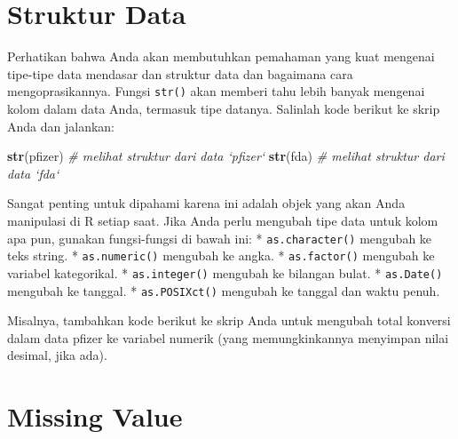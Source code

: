 \documentclass[
]{book}
\newenvironment{Shaded}{\begin{snugshade}}{\end{snugshade}}
\newcommand{\CommentTok}[1]{\textcolor[rgb]{0.56,0.35,0.01}{\textit{#1}}}
\newcommand{\KeywordTok}[1]{\textcolor[rgb]{0.13,0.29,0.53}{\textbf{#1}}}
\newcommand{\NormalTok}[1]{#1}
\newcommand{\OperatorTok}[1]{\textcolor[rgb]{0.81,0.36,0.00}{\textbf{#1}}}
\newcommand{\StringTok}[1]{\textcolor[rgb]{0.31,0.60,0.02}{#1}}
\begin{document}
\hypertarget{struktur-data}{%
\section{Struktur Data}\label{struktur-data}}

Perhatikan bahwa Anda akan membutuhkan pemahaman yang kuat mengenai tipe-tipe data mendasar dan struktur data dan bagaimana cara mengoprasikannya. Fungsi \texttt{str()} akan memberi tahu lebih banyak mengenai kolom dalam data Anda, termasuk tipe datanya. Salinlah kode berikut ke skrip Anda dan jalankan:

\begin{Shaded}
\begin{Highlighting}[]
\KeywordTok{str}\NormalTok{(pfizer)                                       }\CommentTok{# melihat struktur dari data `pfizer`}
\KeywordTok{str}\NormalTok{(fda)                                          }\CommentTok{# melihat struktur dari data `fda`}
\end{Highlighting}
\end{Shaded}

Sangat penting untuk dipahami karena ini adalah objek yang akan Anda manipulasi di R setiap saat. Jika Anda perlu mengubah tipe data untuk kolom apa pun, gunakan fungsi-fungsi di bawah ini:
* \texttt{as.character()} mengubah ke teks string.
* \texttt{as.numeric()} mengubah ke angka.
* \texttt{as.factor()} mengubah ke variabel kategorikal.
* \texttt{as.integer()} mengubah ke bilangan bulat.
* \texttt{as.Date()} mengubah ke tanggal.
* \texttt{as.POSIXct()} mengubah ke tanggal dan waktu penuh.

Misalnya, tambahkan kode berikut ke skrip Anda untuk mengubah total konversi dalam data pfizer ke variabel numerik (yang memungkinkannya menyimpan nilai desimal, jika ada).

\begin{Shaded}
\end{Shaded}

\hypertarget{missing-value}{%
\section{Missing Value}\label{missing-value}}
\end{document}
